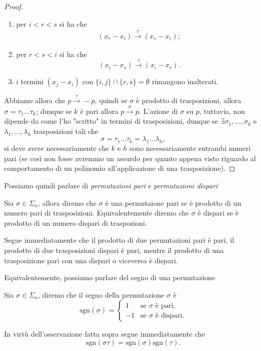 \begin{proof}
\begin{enumerate}[label=\protect\circled{\arabic*}]
        \item per $i < r < s$ si ha che
        \begin{align}
            (x_r - x_i) \stackrel{\tau}{\rightarrow} (x_s - x_i);
        \end{align}
        \item per $r < s < i$ si ha che
        $$
            (x_i - x_s) \stackrel{\tau}{\rightarrow} (x_i - x_r).
        $$ 
        \item i termini $(x_j - x_i)$ con $\{ i, j \} \cap \{r, s\} = \emptyset$ rimangono inalterati.
    \end{enumerate}
    Abbiamo allora che $p \stackrel{\tau}{\rightarrow} -p$, quindi se $\sigma$ è prodotto di trasposizioni, allora $\sigma = \tau_1 \ldots \tau_k$; dunque se $k$ è pari allora $p \stackrel{\sigma}{\rightarrow} p$. L'azione di $\sigma$ su $p$, tuttavia, non dipende da come l'ho "scritto" in termini di trasposizioni, dunque se $\exists \sigma_1, \ldots, \sigma_k$ e $\lambda_1, \ldots, \lambda_h$ trasposizioni tali che
    $$
        \sigma = \tau_1 \ldots \tau_k = \lambda_1 \ldots \lambda_h,
    $$
    si deve avere necessariamente che $k$ e $h$ sono necessariamente entrambi numeri pari (se così non fosse avremmo un assurdo per quanto appena visto riguardo al comportamento di un polinomio all'applicazione di una trasposizione).
\end{proof}

Possiamo quindi parlare di \emph{permutazioni pari} e \emph{permutazioni dispari}
\begin{definition}
    Sia $\sigma \in \Sigma_n$, allora diremo che $\sigma$ è una permutaione pari se è prodotto di un numero pari di trasposizioni. Equivalentemente diremo che $\sigma$ è dispari se è prodotto di un numero dispari di traspozioni.
\end{definition}
\begin{remark}
    Segue immediatamente che il prodotto di due permutazioni pari è pari, il prodotto di due trasposizioni dispari è pari, mentre il prodotto di una trasposizione pari con una dispari o viceversa è dispari.
\end{remark}
Equivalentemente, possiamo parlare del segno di una permutazione
\begin{definition}
    Sia $\sigma \in \Sigma_n$, diremo che il segno della permutazione $\sigma$ è
    $$
        \text{sgn}(\sigma) = \begin{cases}
            1 & \text{se } \sigma \text{ è pari,} \\
            -1 & \text{se } \sigma \text{ è dispari}.
        \end{cases}
    $$
\end{definition}
In virtù dell'osservazione fatta sopra segue immediatamente che
$$
    \text{sgn}(\sigma \tau) = \text{sgn}(\sigma) \text{sgn}(\tau).
$$

